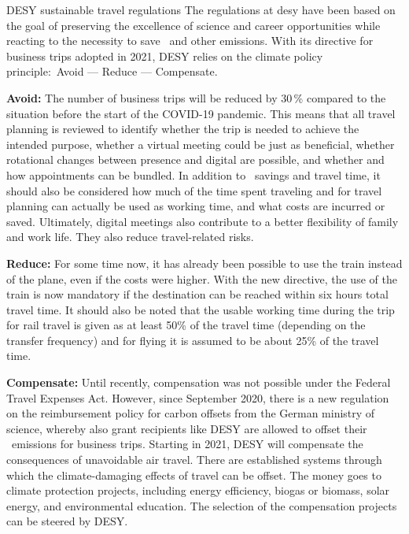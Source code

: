 \documentclass[../SustainableHEP.tex]{subfiles}
\begin{document}
\begin{bestpractice}{DESY sustainable travel regulations}%
    The regulations at \acrshort{desy} have been based on the goal of preserving the excellence of science and career opportunities while reacting to the necessity to save \CdO\ and other emissions. With its directive for business trips adopted in 2021, DESY relies on the climate policy principle:\ Avoid --- Reduce --- Compensate.

    \textbf{Avoid:} The number of business trips will be reduced by 30\,\% compared to the situation before the start of the COVID-19 pandemic. This means that all travel planning is reviewed to identify whether the trip is needed to achieve the intended purpose, whether a virtual meeting could be just as beneficial, whether rotational changes between presence and digital are possible, and whether and how appointments can be bundled. In addition to \CdO\ savings and travel time, it should also be considered how much of the time spent traveling and for travel planning can actually be used as working time, and what costs are incurred or saved. Ultimately, digital meetings also contribute to a better flexibility of family and work life. They also reduce travel-related risks.

    \textbf{Reduce:} For some time now, it has already been possible to use the train instead of the plane, even if the costs were higher.  With the new directive, the use of the train is now mandatory if the destination can be reached within six hours total travel time. It should also be noted that the usable working time during the trip for rail travel is given as at least 50\;\% of the travel time (depending on the transfer frequency) and for flying it is assumed to be about 25\;\% of the travel time.

    \textbf{Compensate:} Until recently, compensation was not possible under the Federal Travel Expenses Act. However, since September 2020, there is a new regulation on the reimbursement policy for carbon offsets from the German ministry of science, whereby also grant recipients like DESY are allowed to offset their \CdO\ emissions for business trips. Starting in 2021, DESY will compensate the consequences of unavoidable air travel. There are established systems through which the climate-damaging effects of travel can be offset. The money goes to climate protection projects, including energy efficiency, biogas or biomass, solar energy, and environmental education. The selection of the compensation projects can be steered by DESY. 
\end{bestpractice}
\end{document}
